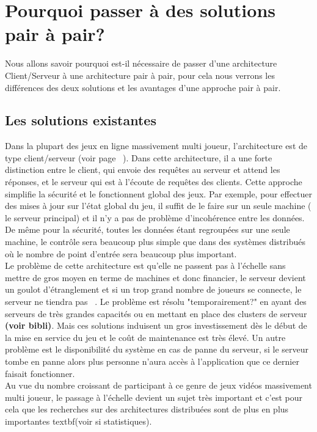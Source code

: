 \section{Pourquoi passer à des solutions pair à pair?}
	\label{whyp2p}
	Nous allons savoir pourquoi est-il nécessaire de passer d'une architecture Client/Serveur à une architecture pair à pair, pour cela nous verrons les différences des deux solutions et les avantages d'une approche pair à pair.
	\subsection{Les solutions existantes}
	Dans la plupart des jeux en ligne massivement multi joueur, l'architecture est de type client/serveur (voir page ~\pageref{P2P/ClServ}). Dans cette architecture, il a une forte distinction entre le client, qui envoie des requêtes au serveur et attend les réponses, et le serveur qui est à l'écoute de requêtes des clients. Cette approche simplifie la sécurité et le fonctionnent global des jeux. Par exemple, pour effectuer des mises à jour sur l'état global du jeu, il suffit de le faire sur un seule machine ( le serveur principal) et il n'y a pas de problème d'incohérence entre les données. De même pour la sécurité, toutes les données étant regroupées sur une seule machine, le contrôle sera beaucoup plus simple que dans des systèmes distribués où le nombre de point d'entrée sera beaucoup plus important. \\
	Le problème de cette architecture est qu'elle ne passent pas à l'échelle sans mettre de gros moyen en terme de machines et donc financier, le serveur devient un goulot d'étranglement et si un trop grand nombre de joueurs se connecte, le serveur ne tiendra pas ~\cite{1198269}. Le problème est résolu "temporairement?" en ayant des serveurs de très grandes capacités ou en mettant en place des clusters de serveur \textbf{(voir bibli)}. Mais ces solutions induisent un gros investissement dès le début de la mise en service du jeu et le coût de maintenance est très élevé. Un autre problème est le disponibilité du système en cas de panne du serveur, si le serveur tombe en panne alors plus personne n'aura accès à l'application que ce dernier faisait fonctionner. \\
	Au vue du nombre croissant de participant à ce genre de jeux vidéos massivement multi joueur, le passage à l'échelle devient un sujet très important et c'est pour cela que les recherches sur des architectures distribuées sont de plus en plus importantes textbf{(voir si statistiques)}. \\
\newline

